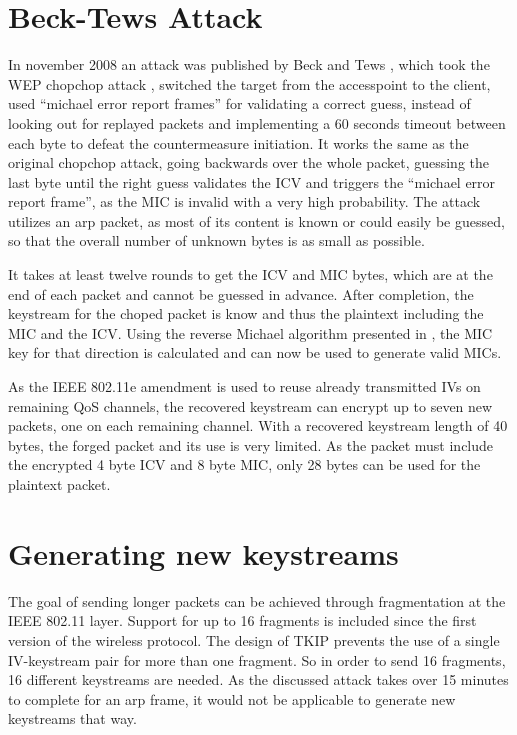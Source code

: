 \documentclass[a4paper,10pt]{scrartcl}
\begin{document}
\section{Beck-Tews Attack}
\label{sec:beck_tews}

In november 2008 an attack was published by Beck and Tews \citep{BT08}, which took the WEP chopchop attack \citep{Kor04}, switched the
target from the accesspoint to the client, used ``michael error report frames'' for validating a correct guess, instead of looking out
for replayed packets and implementing a 60 seconds timeout between each byte to defeat the countermeasure initiation. It works the same
as the original chopchop attack, going backwards over the whole packet, guessing the last byte until the right guess validates the ICV
and triggers the ``michael error report frame'', as the MIC is invalid with a very high probability. The attack utilizes an arp packet,
as most of its content is known or could easily be guessed, so that the overall number of unknown bytes is as small as possible.

It takes at least twelve rounds to get the ICV and MIC bytes, which are at the end of each packet and cannot be guessed in advance.
After completion, the keystream for the choped packet is know and thus the plaintext including the MIC and the ICV\@. Using the reverse
Michael algorithm presented in \citep{BT08}, the MIC key for that direction is calculated and can now be used to generate valid MICs.

As the IEEE 802.11e amendment is used to reuse already transmitted IVs on remaining QoS channels, the recovered keystream can encrypt
up to seven new packets, one on each remaining channel. With a recovered keystream length of 40 bytes, the forged packet and its use
is very limited. As the packet must include the encrypted 4 byte ICV and 8 byte MIC, only 28 bytes can be used for the plaintext packet.

\section{Generating new keystreams}
\label{sec:new_keystreams}

The goal of sending longer packets can be achieved through fragmentation at the IEEE 802.11 layer. Support for up to 16 fragments is
included since the first version of the wireless protocol. The design of TKIP prevents the use of a single IV-keystream pair for more
than one fragment. So in order to send 16 fragments, 16 different keystreams are needed. As the discussed attack takes over 15 minutes
to complete for an arp frame, it would not be applicable to generate new keystreams that way.
\end{document}
